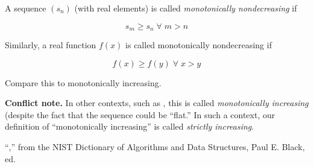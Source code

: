 \documentclass[12pt]{article}
\begin{document}
A sequence $(s_n)$ (with real elements)  is called \emph{monotonically nondecreasing} if 

$$ s_m \ge s_n \;\forall\; m > n $$

Similarly, a real function $f(x)$ is called monotonically nondecreasing if 

$$ f(x) \ge f(y) \;\forall\; x > y $$

Compare this to monotonically increasing.

\textbf{Conflict note.}  In other contexts, such as \cite{NIST}, this is called \emph{monotonically increasing} (despite the fact that the sequence could be ``flat.''  In such a context, our definition of ``monotonically increasing'' is called \emph{strictly increasing}.

\begin{thebibliography}{3}
 ``,'' from the NIST Dictionary of Algorithms and Data Structures, Paul E. Black, ed.
\end{thebibliography}
\end{document}
